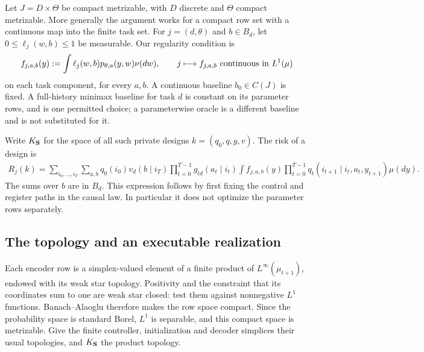 Let $J=D\times\Theta$ be compact metrizable, with $D$ discrete and
$\Theta$ compact metrizable. More generally the argument works for a
compact row set with a continuous map into the finite task set. For
$j=(d,\theta)$ and $b\in B_d$, let $0\le\ell_j(w,b)\le1$ be measurable.
Our regularity condition is
\begin{equation}\label{eq:v10-effect}
 f_{j,a,b}(y):=\int\ell_j(w,b)p_{\theta,a}(y,w)\nu(dw),
 \qquad j\longmapsto f_{j,a,b}\ \hbox{continuous in }L^1(\mu)
\end{equation}
on each task component, for every $a,b$. A continuous baseline
$b_0\in C(J)$ is fixed. A full-history minimax baseline for task $d$
is constant on its parameter rows, and is one permitted choice; a
parameterwise oracle is a different baseline and is not substituted
for it.

Write $K_{\bf S}$ for the space of all such private designs
$k=(q_0,q,g,v)$. The risk of a design is
\begin{align}\label{eq:v10-risk}
 R_j(k)=\sum_{i_0,\ldots,i_T}\sum_{a,b}
 q_0(i_0)v_d(b\mid i_T)
 \prod_{t=0}^{T-1}g_{td}(a_t\mid i_t)
 \int f_{j,a,b}(y)
 \prod_{t=0}^{T-1}q_t(i_{t+1}\mid i_t,a_t,y_{t+1})\mu(dy).
\end{align}
The sums over $b$ are in $B_d$. This expression follows by first fixing
the control and register paths in the causal law. In particular it does
not optimize the parameter rows separately.

\subsection{The topology and an executable realization}
Each encoder row is a simplex-valued element of a finite product of
$L^\infty(\mu_{t+1})$, endowed with its weak star topology. Positivity
and the constraint that its coordinates sum to one are weak star
closed: test them against nonnegative $L^1$ functions. Banach--Alaoglu
therefore makes the row space compact. Since the probability space is
standard Borel, $L^1$ is separable, and this compact space is metrizable.
Give the finite controller, initialization and decoder simplices their
usual topologies, and $K_{\bf S}$ the product topology.

